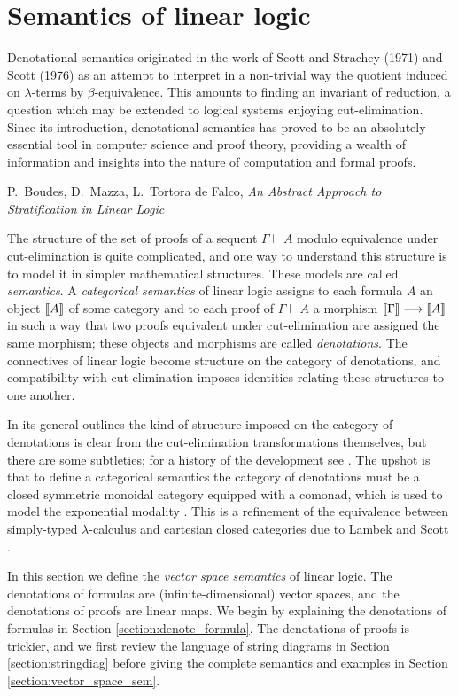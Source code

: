 \documentclass[english,letter paper,12pt,reqno]{article}
\theoremstyle{example}
\begin{document}
\section{Semantics of linear logic}\label{section:diagrammatics}

\setlength{\epigraphwidth}{0.8\textwidth}
\epigraph{Denotational semantics originated in the work of Scott and Strachey (1971) and Scott (1976) as an attempt to interpret in a non-trivial way the quotient induced on $\lambda$-terms by $\beta$-equivalence. This amounts to finding an invariant of reduction, a question which may be extended to logical systems enjoying cut-elimination. Since its introduction, denotational semantics has proved to be an absolutely essential tool in computer science and proof theory, providing a wealth of information and insights into the nature of computation and formal proofs.}{P.~Boudes, D.~Mazza, L.~Tortora de Falco, \textit{An Abstract Approach to Stratification in Linear Logic}}

The structure of the set of proofs of a sequent $\Gamma \vdash A$ modulo equivalence under cut-elimination is quite complicated, and one way to understand this structure is to model it in simpler mathematical structures. These models are called \emph{semantics}. A \emph{categorical semantics} of linear logic \cite{mellies, blue_book} assigns to each formula $A$ an object $\llbracket A \rrbracket$ of some category and to each proof of $\Gamma \vdash A$ a morphism $\llbracket \Gamma \rrbracket \longrightarrow \llbracket A \rrbracket$ in such a way that two proofs equivalent under cut-elimination are assigned the same morphism; these objects and morphisms are called \emph{denotations}. The connectives of linear logic become structure on the category of denotations, and compatibility with cut-elimination imposes identities relating these structures to one another.

In its general outlines the kind of structure imposed on the category of denotations is clear from the cut-elimination transformations themselves, but there are some subtleties; for a history of the development see \cite{mellies}. The upshot is that to define a categorical semantics the category of denotations must be a closed symmetric monoidal category equipped with a comonad, which is used to model the exponential modality \cite[\S 7]{mellies}. This is a refinement of the equivalence between simply-typed $\lambda$-calculus and cartesian closed categories due to Lambek and Scott \cite{lambek}. 

In this section we define the \textsl{vector space semantics} of linear logic. The denotations of formulas are (infinite-dimensional) vector spaces, and the denotations of proofs are linear maps. We begin by explaining the denotations of formulas in Section \ref{section:denote_formula}. The denotations of proofs is trickier, and we first review the language of string diagrams in Section \ref{section:stringdiag} before giving the complete semantics and examples in Section \ref{section:vector_space_sem}.
\end{document}

